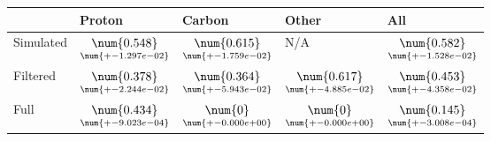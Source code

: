 \begin{tabular}{lllll}
\toprule
{} &                                              Proton &                                              Carbon &                                               Other &                                                 All \\
\midrule
Simulated &  $\underset{\num{+- 1.297e-02 }  }{\num{ 0.548 } }$ &  $\underset{\num{+- 1.759e-02 }  }{\num{ 0.615 } }$ &  N/A &  $\underset{\num{+- 1.528e-02 }  }{\num{ 0.582 } }$ \\
Filtered  &  $\underset{\num{+- 2.244e-02 }  }{\num{ 0.378 } }$ &  $\underset{\num{+- 5.943e-02 }  }{\num{ 0.364 } }$ &  $\underset{\num{+- 4.885e-02 }  }{\num{ 0.617 } }$ &  $\underset{\num{+- 4.358e-02 }  }{\num{ 0.453 } }$ \\
Full      &  $\underset{\num{+- 9.023e-04 }  }{\num{ 0.434 } }$ &  $\underset{\num{+- 0.000e+00 }  }{\num{ 0 } }$ &  $\underset{\num{+- 0.000e+00 }  }{\num{ 0 } }$ &  $\underset{\num{+- 3.008e-04 }  }{\num{ 0.145 } }$ \\
\bottomrule
\end{tabular}
